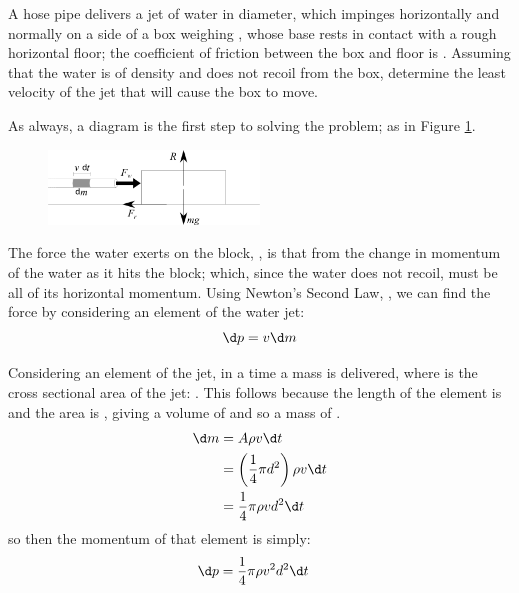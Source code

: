 
\begin{problem} %
{A hose pipe delivers a jet of water  in diameter, which impinges horizontally and normally on a side of a box weighing , whose base rests in contact with a rough horizontal floor; the coefficient of friction between the box and floor is .  Assuming that the water is of density  and does not recoil from the box, determine the least velocity of the jet that will cause the box to move.}
{}
{As always, a diagram is the first step to solving the problem; as in Figure \ref{fig:Dynamics_water_jet_block}.

\begin{figure}[h]
	\centering
	\includegraphics[width=0.5\textwidth]{../../../figures/Dynamics_water_jet_block.svg}
	\caption{}
	\label{fig:Dynamics_water_jet_block}
\end{figure}

The force the water exerts on the block, , is that from the change in momentum of the water as it hits the block; which, since the water does not recoil, must be all of its horizontal momentum. Using Newton's Second Law, , we can find the force by considering an element of the water jet:
\begin{equation*} 
\d p = v \d m 
\end{equation*}

Considering an element of the jet, in a time  a mass  is delivered, where  is the cross sectional area of the jet: . This follows because the length of the element is  and the area is , giving a volume of  and so a mass of .
\begin{align*} 
\d m & = A \rho v \d t \\ 
&= \left(\frac{1}{4}\pi d^{2}\right) \rho v \d t \\
 &= \frac{1}{4} \pi \rho v d^{2} \d t 
 \end{align*}
so then the momentum of that element  is simply:
\begin{align*} 
\d p &= \frac{1}{4}\pi\rho v^{2} d^{2} \d t 
\end{align*}

}
\end{problem}
